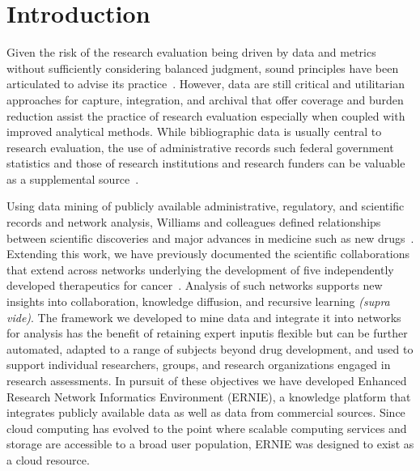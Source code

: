 \documentclass[review]{elsarticle}
\begin{document}
\linenumbers
\raggedright

\section*{Introduction} 

Given the risk of the research evaluation being driven by data and metrics without sufficiently considering balanced judgment, sound principles have been articulated to advise its practice~\cite{LeidenManifesto2015}. However, data are still critical and utilitarian approaches for capture, integration, and archival that offer coverage and burden reduction assist the practice of research evaluation especially when coupled with improved analytical methods. While bibliographic data is usually central to research evaluation, the use of administrative records such federal government statistics and those of research institutions and research funders can be valuable as a supplemental source~\cite{FedStat2017}. 

Using data mining of publicly available administrative, regulatory, and scientific records and network analysis, Williams and colleagues defined relationships between scientific discoveries and major advances in medicine such as new drugs~\cite{Williams2015}. Extending this work, we have previously documented the scientific collaborations that extend across networks underlying the development of five independently developed therapeutics for cancer~\cite{Keserci2017}. Analysis of such networks supports new insights into collaboration, knowledge diffusion, and recursive learning \textit{(supra vide)}. The framework we developed to mine data and integrate it into networks for analysis has the benefit of retaining expert inputis flexible but can be further automated, adapted to a range of subjects beyond drug development, and used to support individual researchers, groups, and research organizations engaged in research assessments. In pursuit of these objectives we have developed Enhanced Research Network Informatics Environment (ERNIE), a knowledge platform that integrates publicly available data as well as data from commercial sources. Since cloud computing has evolved to the point where scalable computing services and storage are accessible to a broad user population, ERNIE was designed to exist as a cloud resource. 
\end{document}
